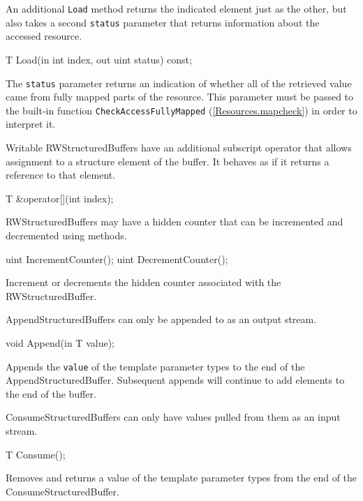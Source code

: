 An additional \texttt{Load} method returns the indicated element just as the other,
but also takes a second \texttt{status} parameter that returns information about the accessed resource.
\begin{HLSL}
 T Load(in int index, out uint status) const;
\end{HLSL}

The \texttt{status} parameter returns an indication of whether all of the retrieved value
came from fully mapped parts of the resource.
This parameter must be passed to the built-in function \texttt{CheckAccessFullyMapped} (\ref{Resources.mapcheck})
in order to interpret it.

Writable RWStructuredBuffers have an additional subscript operator that allows assignment to a structure element of the buffer.
It behaves as if it returns a reference to that element.
\begin{HLSL}
 T &operator[](int index);
\end{HLSL}


RWStructuredBuffers may have a hidden counter that can be incremented and decremented using methods.

\begin{HLSL}
   uint IncrementCounter();
   uint DecrementCounter();
\end{HLSL}

Increment or decrements the hidden counter associated with the RWStructuredBuffer.


AppendStructuredBuffers can only be appended to as an output stream.

\begin{HLSL}
   void Append(in T value);
\end{HLSL}

Appends the \texttt{value} of the template parameter types to the end of the AppendStructuredBuffer.
Subsequent appends will continue to add elements to the end of the buffer.


ConsumeStructuredBuffers can only have values pulled from them as an input stream.

\begin{HLSL}
   T Consume();
\end{HLSL}

Removes and returns a value of the template parameter types from the end of the ConsumeStructuredBuffer.


